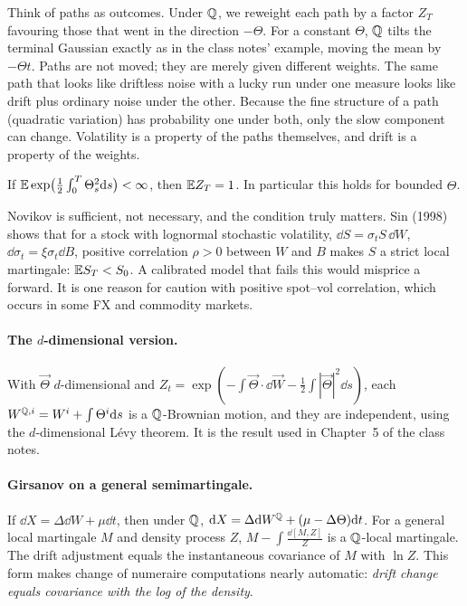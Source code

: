 \begin{intuition}
Think of paths as outcomes. Under $\mathbb{Q}$, we reweight each path by a factor $Z_T$ favouring those that went in the direction $-\Theta$. For a constant $\Theta$, $\mathbb{Q}$ tilts the terminal Gaussian exactly as in the class notes' example, moving the mean by $-\Theta t$. Paths are not moved; they are merely given different weights. The same path that looks like driftless noise with a lucky run under one measure looks like drift plus ordinary noise under the other. Because the fine structure of a path (quadratic variation) has probability one under both, only the slow component can change. Volatility is a property of the paths themselves, and drift is a property of the weights.
\end{intuition}

\begin{theorem}\label{thm:novikov}
If $\mathbb{E}\exp\bigl(\tfrac12\int_0^T\Theta_s^2\mathrm{d} s\bigr)<\infty$, then $\mathbb{E} Z_T=1$. In particular this holds for bounded $\Theta$.
\end{theorem}

\begin{pitfall}
Novikov is sufficient, not necessary, and the condition truly matters. Sin (1998) shows that for a stock with lognormal stochastic volatility, $\dd S=\sigma_tS\,\dd W$, $\dd\sigma_t=\xi\sigma_t\dd B$, positive correlation $\rho>0$ between $W$ and $B$ makes $S$ a strict local martingale: $\mathbb{E} S_T<S_0$. A calibrated model that fails this would misprice a forward. It is one reason for caution with positive spot--vol correlation, which occurs in some FX and commodity markets.
\end{pitfall}

\paragraph{The $d$-dimensional version.} With $\vec\Theta$ $d$-dimensional and $Z_t=\exp(-\int\vec\Theta\cdot\dd\vec W-\tfrac12\int|\vec\Theta|^2\dd s)$, each $W^{\mathbb{Q},i}=W^i+\int\Theta^i\mathrm{d} s$ is a $\mathbb{Q}$-Brownian motion, and they are independent, using the $d$-dimensional L\'evy theorem. It is the result used in Chapter~5 of the class notes.

\paragraph{Girsanov on a general semimartingale.} If $\dd X=\Delta\dd W+\mu\dd t$, then under $\mathbb{Q}$, $\mathrm{d} X=\Delta\mathrm{d} W^{\mathbb{Q}}+(\mu-\Delta\Theta)\mathrm{d} t$. For a general local martingale $M$ and density process $Z$, $M-\int\frac{\dd[M,Z]}{Z}$ is a $\mathbb{Q}$-local martingale. The drift adjustment equals the instantaneous covariance of $M$ with $\ln Z$. This form makes change of numeraire computations nearly automatic: \emph{drift change equals covariance with the log of the density}.

